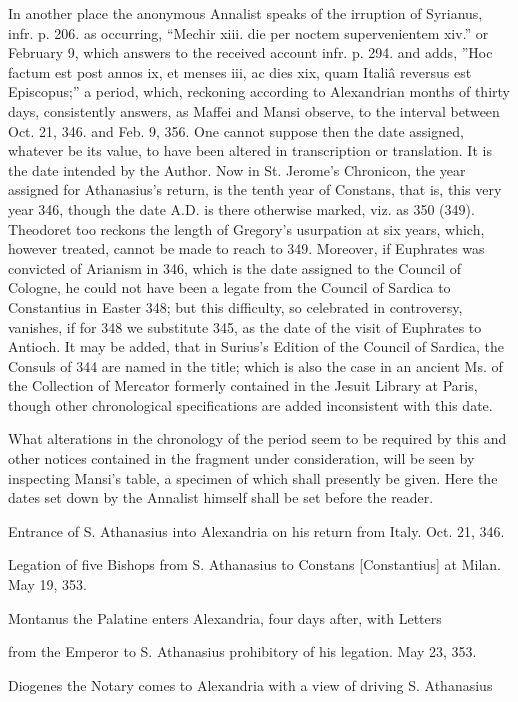 In another place the anonymous
Annalist speaks of the irruption of Syrianus, infr. p. 206. as
occurring, “Mechir xiii. die per noctem supervenientem xiv.” or
February 9, which answers to the received account infr. p. 294. and
adds, ”Hoc factum est post annos ix, et menses iii, ac dies xix,
quam Italiâ reversus est Episcopus;” a period, which, reckoning
according to Alexandrian months of thirty days, consistently answers,
as Maffei and Mansi observe, to the interval between Oct. 21, 346. and
Feb. 9, 356. One cannot suppose then the date assigned, whatever be
its value, to have been altered in transcription or translation. It is
the date intended by the Author. Now in St. Jerome's Chronicon, the
year assigned for Athanasius's return, is the tenth year of Constans,
that is, this very year 346, though the date A.D.
is there otherwise marked, viz. as 350 (349). Theodoret too reckons
the length of Gregory's usurpation at six years, which, however
treated, cannot be made to reach to 349. Moreover, if Euphrates was
convicted of Arianism in 346, which is the date assigned to the
Council of Cologne, he could not have been a legate from the Council
of Sardica to Constantius in Easter 348; but this difficulty, so
celebrated in controversy, vanishes, if for 348 we substitute 345, as
the date of the visit of Euphrates to Antioch. It may be added, that
in Surius's Edition of the Council of Sardica, the Consuls of 344 are
named in the title; which is also the case in an ancient Ms. of the
Collection of Mercator formerly contained in the Jesuit Library at
Paris, though other chronological specifications are added
inconsistent with this date.

What alterations in the
chronology of the period seem to be required by this and other
notices contained in the fragment under consideration, will be seen by
inspecting Mansi's table, a specimen of which shall presently be
given. Here the dates set down by the Annalist himself shall be set
before the reader.

Entrance of
S. Athanasius into Alexandria on his return from Italy.
Oct. 21, 346.

Legation of
five Bishops from S. Athanasius to Constans [Constantius] at
Milan.
May 19, 353.

Montanus the
Palatine enters Alexandria, four days after, with Letters

from the Emperor to S. Athanasius
prohibitory of his legation.
May 23, 353.

Diogenes the
Notary comes to Alexandria with a view of driving S. Athanasius

